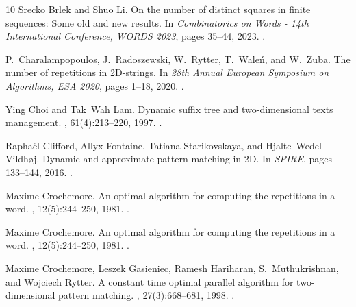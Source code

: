 \documentclass[11pt,letterpaper]{article}
\begin{document}
\begin{thebibliography}{10}
Srecko Brlek and Shuo Li.
\newblock On the number of distinct squares in finite sequences: Some old and
  new results.
\newblock In {\em Combinatorics on Words - 14th International Conference,
  {WORDS} 2023}, pages 35--44, 2023.
\newblock \href {https://doi.org/10.1007/978-3-031-33180-0\_3}
  {}.

P.~Charalampopoulos, J.~Radoszewski, W.~Rytter, T.~Waleń, and W.~Zuba.
\newblock The number of repetitions in {2D}-strings.
\newblock In {\em 28th Annual European Symposium on Algorithms, {ESA} 2020},
  pages 1--18, 2020.
\newblock \href {https://doi.org/10.4230/LIPICS.ESA.2020.32}
  {}.

Ying Choi and Tak~Wah Lam.
\newblock Dynamic suffix tree and two-dimensional texts management.
, 61(4):213--220, 1997.
\newblock \href {https://doi.org/10.1016/S0020-0190(97)00018-5}
  {}.

Rapha{\"{e}}l Clifford, Allyx Fontaine, Tatiana Starikovskaya, and Hjalte~Wedel
  Vildh{\o}j.
\newblock Dynamic and approximate pattern matching in {2D}.
\newblock In {\em {SPIRE}}, pages 133--144, 2016.
\newblock \href {https://doi.org/10.1007/978-3-319-46049-9\_13}
  {}.

Maxime Crochemore.
\newblock An optimal algorithm for computing the repetitions in a word.
, 12(5):244--250, 1981.
\newblock \href {https://doi.org/10.1016/0020-0190(81)90024-7}
  {}.

Maxime Crochemore.
\newblock An optimal algorithm for computing the repetitions in a word.
, 12(5):244--250, 1981.
\newblock \href {https://doi.org/10.1016/0020-0190(81)90024-7}
  {}.

Maxime Crochemore, Leszek Gasieniec, Ramesh Hariharan, S.~Muthukrishnan, and
  Wojciech Rytter.
\newblock A constant time optimal parallel algorithm for two-dimensional
  pattern matching.
, 27(3):668--681, 1998.
\newblock \href {https://doi.org/10.1137/S0097539795280068}
  {}.


\end{thebibliography}
\end{document}
